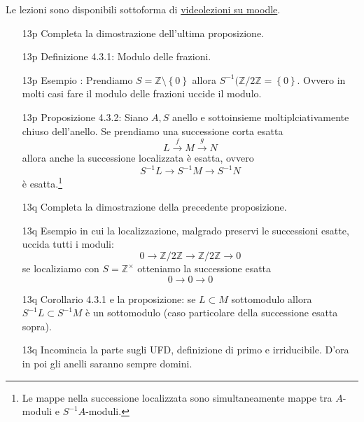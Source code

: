 \documentclass[italian]{article}
\begin{document}
	Le lezioni sono disponibili sottoforma di 
	\href{https://didatticaonline.unitn.it/dol/course/view.php?id=23268}{videolezioni
		su moodle}.
	
	\begin{enumerate}
      \item[13p] Completa la dimostrazione dell'ultima proposizione.
      \item[13p] Definizione 4.3.1\cite{vergura}: Modulo delle frazioni. 
      \item[13p] Esempio : Prendiamo $S = \mathbb{Z} \setminus \left\{ 0
        \right\}$ allora $S^{-1}(\mathbb{Z}/2\mathbb{Z} = \left\{ 0 \right\}$.
        Ovvero in molti casi fare il modulo delle frazioni uccide il modulo.
      \item[13p] Proposizione 4.3.2\cite{vergura}: Siano $A,S$ anello e 
        sottoinsieme moltiplciativamente chiuso dell'anello. 
        Se prendiamo una successione corta esatta 
        \begin{equation*}
          L \xrightarrow{f} M \xrightarrow{g} N
        \end{equation*}
        allora anche la successione localizzata è esatta, ovvero
        \begin{equation*}
          S^{-1}L \to S^{-1}M \to S^{-1}N
        \end{equation*}
        è esatta.\footnote{Le mappe nella successione localizzata sono
        simultaneamente mappe tra $A$-moduli e $S^{-1}A$-moduli.}
      \item[13q] Completa la dimostrazione della precedente proposizione.
      \item[13q] Esempio in cui la localizzazione, malgrado preservi le
        successioni esatte, uccida tutti i moduli:
        \begin{equation*}
          0 \to  \mathbb{Z}/2 \mathbb{Z} \to  \mathbb{Z}/2\mathbb{Z} \to 0
        \end{equation*}
        se localiziamo con $S = \mathbb{Z}^{\times}$ otteniamo la successione
        esatta
        \begin{equation*}
          0 \to  0 \to 0
        \end{equation*}
      \item[13q] Corollario 4.3.1 e la proposizione: se $L \subset M$ sottomodulo 
        allora $S^{-1}L \subset S^{-1}M$ è un sottomodulo 
        (caso particolare della successione esatta sopra).
      \item[13q] Incomincia la parte sugli UFD, definizione di primo
        e irriducibile. D'ora in poi gli anelli saranno sempre domini.

\end{enumerate}
\end{document}
